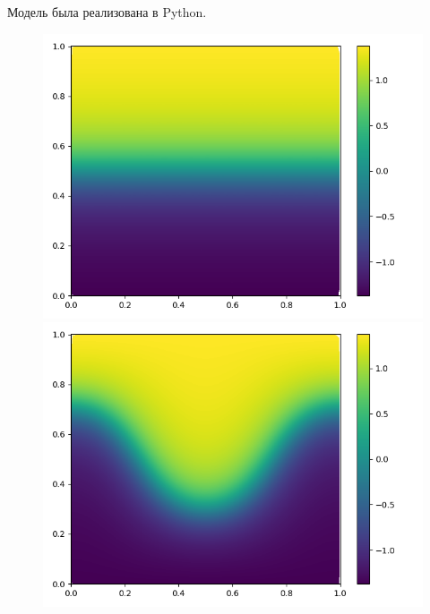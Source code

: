 \documentclass[a4paper, 14pt]{extarticle}
\begin{document}
		Модель была реализована в Python.
		\begin{figure}[H]
			\begin{minipage}{0.5\textwidth}
				\centering
				\includegraphics[width = \linewidth]{1.png}
			\end{minipage}\hfill
			\begin{minipage}{0.5\textwidth}
				\centering
				\includegraphics[width = \linewidth]{2.png}
			\end{minipage}\hfill
		\end{figure}
	
\end{document}
